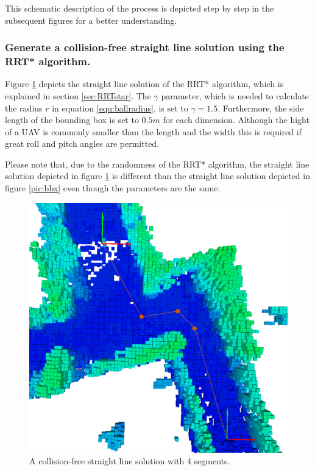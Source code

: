 This schematic description of the process is depicted step by step in the subsequent figures for a better understanding.

\subsubsection{Generate a collision-free straight line solution using the RRT* algorithm.}

Figure \ref{pic:RRTstepOne} depicts the straight line solution of the RRT* algorithm, which is explained in section \ref{sec:RRTstar}.  The $\gamma$ parameter, which is needed to calculate the radius $r$ in equation \ref{equ:ballradius}, is set to $\gamma = 1.5$. Furthermore, the side length of the bounding box is set to $0.5m$ for each dimension. Although the hight of a UAV is commonly smaller than the length and the width this is required if great roll and pitch angles are permitted. \newline


Please note that, due to the randomness of the RRT* algorithm, the straight line solution depicted in figure  \ref{pic:RRTstepOne} is different than the straight line solution depicted in figure \ref{pic:bbx} even though the parameters are the same. 

\begin{figure}[h]
   \centering
   \includegraphics[trim = 45mm 0mm 35mm 0mm,clip,width=1\textwidth]{pics/extensionLongP.png}
   \caption{A collision-free straight line solution with 4 segments.}
   \label{pic:RRTstepOne}
\end{figure}


